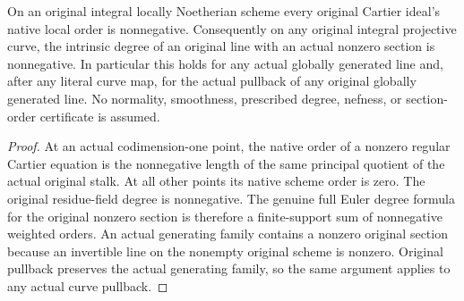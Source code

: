 \begin{theorem}
\label{thm:fc-original-curve-generated-line-degree-nonnegative}
\leanok
{}
On an original integral locally Noetherian scheme every original
Cartier ideal's native local order is nonnegative. Consequently on
any original integral projective curve, the intrinsic degree of an
original line with an actual nonzero section is nonnegative. In
particular this holds for any actual globally generated line and,
after any literal curve map, for the actual pullback of any original
globally generated line. No normality, smoothness, prescribed degree,
nefness, or section-order certificate is assumed.
\end{theorem}
\begin{proof}
At an actual codimension-one point, the native order of a nonzero
regular Cartier equation is the nonnegative length of the same
principal quotient of the actual original stalk. At all other points
its native scheme order is zero. The original residue-field degree is
nonnegative. The genuine full Euler degree formula for the original
nonzero section is therefore a finite-support sum of nonnegative
weighted orders. An actual generating family contains a nonzero
original section because an invertible line on the nonempty original
scheme is nonzero. Original pullback preserves the actual generating
family, so the same argument applies to any actual curve pullback.
\end{proof}
